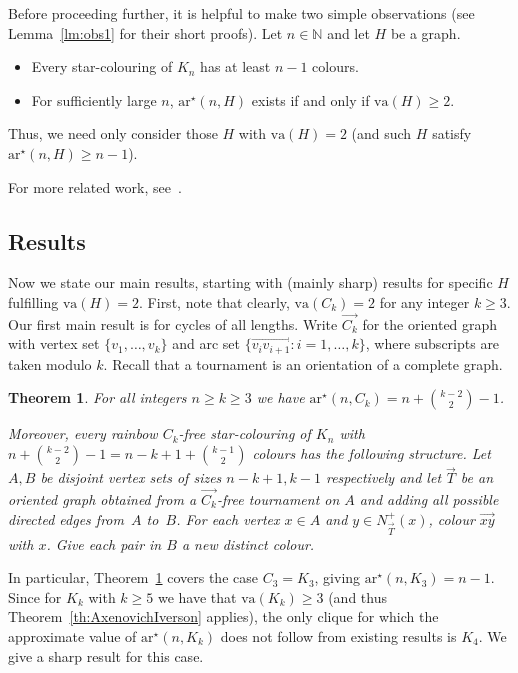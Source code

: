 \documentclass[a4paper, 12pt]{article}
\numberwithin{equation}{section}
\newtheorem{theorem}{Theorem}[section]
\def\sar{{\mathrm{ar}^{\star}}}
\def\va{{\mathrm{va}}}
\newcommand{\ova}[1]{\overrightarrow{#1}}
\begin{document}
Before proceeding further, it is helpful to make two simple observations (see Lemma~\ref{lm:obs1} for their short proofs).
Let $n\in\mathbb N$ and let  $H$ be a graph. 
\medskip
\begin{itemize}
    \item Every star-colouring of $K_n$ has at least $n-1$ colours.
    \item For sufficiently large $n$, $\sar(n,H)$ exists if and only if $\va(H) \geq 2$.
\end{itemize}

\medskip
Thus, we need only consider those $H$ with $\va(H)=2$ (and such $H$ satisfy $\sar(n,H) \geq n-1$).


\medskip
For more related work, see~\cite{AxenovichKundgen,CzygrinowMollaNagle,JamisonJiangLing,JungicKaiserKral,Li}.


\subsection{Results}


Now we state our main results, starting with (mainly sharp) results for specific $H$ fulfilling $\va(H)=2$.
First, note that clearly, $\va(C_k)=2$ for any integer $k \geq 3$. 
Our first main result is for cycles of all lengths. Write $\ova{C_k}$ for the oriented graph with vertex set $\{v_1, \ldots, v_k\}$ and arc set $\{\ova{v_iv_{i+1}}: i=1, \ldots, k\}$, where subscripts are taken modulo $k$.
Recall that a tournament is an orientation of a complete graph.

\begin{theorem}\label{th:cycle}
	For all integers $n \geq k \geq 3$ we have $\sar(n,C_k)=n+{k-2 \choose 2}-1$.
    
    Moreover, every rainbow $C_k$-free star-colouring of $K_n$ with $n+\binom{k-2}{2}-1 =n-k+1+{k-1\choose 2}$ colours has the following structure. Let $A,B$ be disjoint vertex sets of sizes $n-k+1,k-1$ respectively and let $\ova{T}$ be an oriented graph obtained from a $\ova{C_k}$-free tournament on $A$ and adding all possible directed edges from~$A$ to~$B$. 
    For each vertex $x \in A$ and $y \in N_{\ova{T}}^+(x)$, colour $\ova{xy}$ with $x$. Give each pair in $B$ a new distinct colour.
\end{theorem}

In particular, Theorem~\ref{th:cycle} covers the case $C_3=K_3$, giving $\sar(n,K_3)=n-1$. Since for $K_k$ with $k\ge 5$ we have that $\va(K_k) \geq 3$ (and thus Theorem~\ref{th:AxenovichIverson} applies), 
the only clique for which the approximate value of $\sar(n,K_k)$ does not follow from existing results is $K_4$. We give a sharp result for this case.
\end{document}
